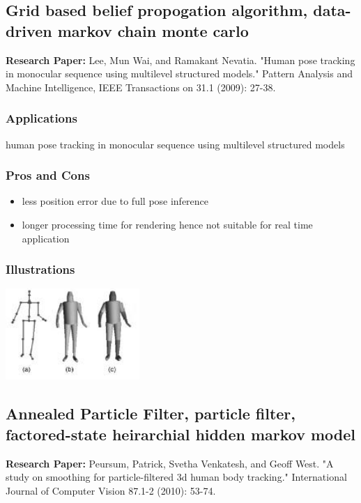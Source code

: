 \documentclass[a4paper,10pt]{report}
\begin{document}
\subsection{Grid based belief propogation algorithm, data-driven markov chain monte carlo}
\textbf{Research Paper:} Lee, Mun Wai, and Ramakant Nevatia. "Human pose tracking in monocular sequence using multilevel structured models." Pattern Analysis and Machine Intelligence, IEEE Transactions on 31.1 (2009): 27-38.
\subsubsection{Applications}
human pose tracking in monocular sequence using multilevel structured models
\subsubsection{Pros and Cons}
\begin{itemize}
 \item less position error due to full pose inference
 \item longer processing time for rendering hence not suitable for real time application
\end{itemize}
\subsubsection{Illustrations}\newline\newline
\includegraphics{./skeltrack8.png}
\newline \newline

\subsection{Annealed Particle Filter, particle filter, factored-state heirarchial hidden markov model}
\textbf{Research Paper:} Peursum, Patrick, Svetha Venkatesh, and Geoff West. "A study on smoothing for particle-filtered 3d human body tracking." International Journal of Computer Vision 87.1-2 (2010): 53-74.
\end{document}
